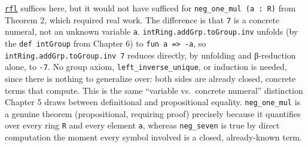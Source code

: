 \href{https://lean-lang.org/doc/reference/latest/Tactic-Proofs/Tactic-Reference/}{\texttt{rfl}} suffices here, but it would not have sufficed for \texttt{neg\_\allowbreak{}one\_\allowbreak{}mul (a : R)} from Theorem 2, which required real work. The difference is that \texttt{7} is a concrete numeral, not an unknown variable \texttt{a}. \texttt{intRing.addGrp.toGroup.inv} unfolds (by the \texttt{def intGroup} from Chapter 6) to \texttt{fun a => -\allowbreak{}a}, so \texttt{intRing.addGrp.toGroup.inv 7} reduces directly, by unfolding and β-reduction alone, to \texttt{-\allowbreak{}7}. No group axiom, \texttt{left\_\allowbreak{}inverse\_\allowbreak{}unique}, or induction is needed, since there is nothing to generalize over: both sides are already closed, concrete terms that compute. This is the same ``variable vs.~concrete numeral'' distinction Chapter 5 draws between definitional and propositional equality. \texttt{neg\_\allowbreak{}one\_\allowbreak{}mul} is a genuine theorem (propositional, requiring proof) precisely because it quantifies over every ring \texttt{R} and every element \texttt{a}, whereas \texttt{neg\_\allowbreak{}seven} is true by direct computation the moment every symbol involved is a closed, already-known term.
